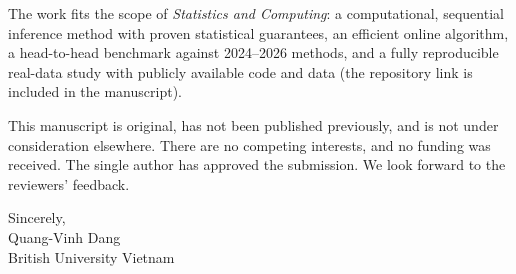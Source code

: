 \documentclass[11pt]{article}
\begin{document}
The work fits the scope of \textit{Statistics and Computing}: a computational,
sequential inference method with proven statistical guarantees, an efficient
online algorithm, a head-to-head benchmark against 2024--2026 methods, and a fully
reproducible real-data study with publicly available code and data (the repository
link is included in the manuscript).

This manuscript is original, has not been published previously, and is not under
consideration elsewhere. There are no competing interests, and no funding was
received. The single author has approved the submission. We look forward to the
reviewers' feedback.

\medskip
\noindent
Sincerely,\\[1.2\baselineskip]
Quang-Vinh Dang\\
British University Vietnam
\end{document}
